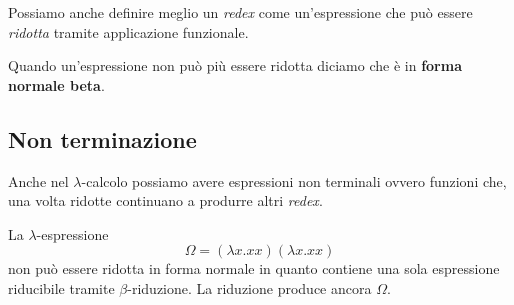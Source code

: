 Possiamo anche definire meglio un \emph{redex} come un'espressione che può essere \emph{ridotta} tramite applicazione
funzionale.

Quando un'espressione non può più essere ridotta diciamo che è in \textbf{forma normale beta}.

\subsection{Non terminazione}
Anche nel $\lambda$-calcolo possiamo avere espressioni non terminali ovvero funzioni che, una volta ridotte continuano
a produrre altri \emph{redex}.

La $\lambda$-espressione
\[ \Omega = (\lambda x.xx) (\lambda x.xx) \]
non può essere ridotta in forma normale in quanto contiene una sola espressione riducibile tramite $\beta$-riduzione.
La riduzione produce ancora $\Omega$.